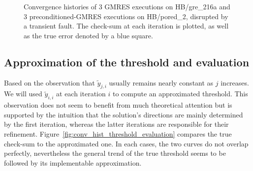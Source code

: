 \documentclass[twoside]{article}
\newcounter{fig}\setcounter{fig}{0}
\begin{document}
\begin{figure}[H]
\begin{minipage}[b]{0.48\linewidth}
      
    \end{minipage}
    \caption{Convergence histories of 3 GMRES executions on HB/gre_216a and 3 preconditioned-GMRES executions on HB/pored_2, disrupted by a transient fault. The check-sum at each iteration is plotted, as well as the true error denoted by a blue square.} %
    \label{fig:conv_hist_checksum}
  \end{figure}






  \subsection{Approximation of the threshold and evaluation}\label{sec:threshold}
  Based on the observation that $\widetilde{y}_{j, i}$ usually remains nearly constant as $j$ increases. We will used $\widetilde{y}_{i, i}$ at each iteration $i$ to compute an approximated threshold. This observation does not seem to benefit from much theoretical attention but is supported by the intuition that the solution's directions are mainly determined by the first iteration, whereas the latter iterations are responsible for their refinement. Figure~\ref{fig:conv_hist_threshold_evaluation} compares the true check-sum to the approximated one. In each cases, the two curves do not overlap perfectly, nevertheless the general trend of the true threshold seems to be followed by its implementable approximation.
\end{document}
